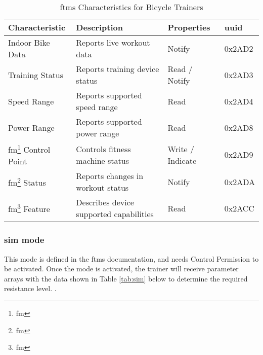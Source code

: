 \begin{table}[H]
	\renewcommand{\arraystretch}{\tablestretch}
	\centering
	\caption{\ac{ftms} Characteristics for Bicycle Trainers}
	\citep[2022]{Huawei:2022}
	\begin{tabularx}{\textwidth}{>{\raggedright}p{3cm} >{\raggedright}X >{\raggedright}p{2.3cm} p{1.3cm}}
		\toprule
		Characteristic                               & Description                             & Properties       & \acs{uuid} \\
		\midrule
		Indoor Bike Data                             & Reports live workout data               & Notify           & 0x2AD2     \\
		Training Status                              & Reports training device status          & Read / Notify    & 0x2AD3     \\
		Speed Range                                  & Reports supported speed range           & Read             & 0x2AD4     \\
		Power Range                                  & Reports supported power range           & Read             & 0x2AD8     \\
		\acs{fm}\footnote[1]{\acf{fm}} Control Point & Controls fitness machine status         & Write / Indicate & 0x2AD9     \\
		\acs{fm}\footnote[1]{\acf{fm}} Status        & Reports changes in workout status       & Notify           & 0x2ADA     \\
		\acs{fm}\footnote[1]{\acf{fm}} Feature       & Describes device supported capabilities & Read             & 0x2ACC     \\
		\bottomrule
	\end{tabularx}
	\label{tab:ftmsft}
\end{table}

\vspace*{0.5cm}

\subsubsection{\acf{sim} mode}
\label{sec:sim}

This mode is defined in the \ac{ftms} documentation, and needs Control Permission to be activated. Once the mode is activated, the trainer will receive parameter arrays with the data shown in Table \ref{tab:sim} below to determine the required resistance level. \cite[2017]{BLSIG:2017}.


